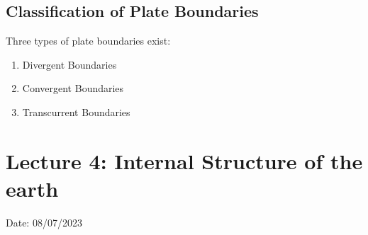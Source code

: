 \documentclass{article}
\begin{document}
\subsection*{Classification of Plate Boundaries} 
Three types of plate boundaries exist:
\begin{enumerate}
  \item Divergent Boundaries 
  \item Convergent Boundaries 
  \item Transcurrent Boundaries 
\end{enumerate}
\hrulefill

\section{Lecture 4: Internal Structure of the earth}
\hfill Date: 08/07/2023 
\end{document}
